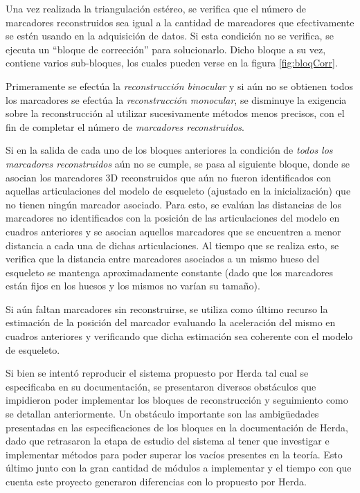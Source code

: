 Una vez realizada la triangulación estéreo, se verifica que el número de marcadores reconstruidos sea igual a la cantidad de marcadores que efectivamente se estén usando en la adquisición de datos. Si esta condición no se verifica, se ejecuta un “bloque de corrección” para solucionarlo. Dicho bloque a su vez, contiene  varios sub-bloques, los cuales pueden verse en la figura \ref{fig:bloqCorr}.

Primeramente se efectúa la \emph{reconstrucción binocular} y si aún no se obtienen todos los marcadores se efectúa la \emph{reconstrucción monocular}, se disminuye la exigencia sobre la reconstrucción al utilizar sucesivamente métodos menos precisos, con el fin de completar el número de \emph{marcadores reconstruidos}.

 Si en la salida de cada uno de los bloques anteriores la condición de \emph{todos los marcadores reconstruidos} aún no se cumple, se pasa al siguiente bloque, donde se asocian los marcadores 3D reconstruidos que aún no fueron identificados con aquellas articulaciones del modelo de esqueleto (ajustado en la inicialización) que no tienen ningún marcador asociado. Para esto, se evalúan las distancias de los marcadores no identificados con la posición de las articulaciones del modelo en cuadros anteriores y se asocian aquellos marcadores que se encuentren a menor distancia a cada una de dichas articulaciones. Al tiempo que se realiza esto, se verifica que la distancia entre marcadores asociados a un mismo hueso del esqueleto se mantenga aproximadamente constante (dado que los marcadores están fijos en los huesos y los mismos no varían su tamaño).
 
Si aún faltan marcadores sin reconstruirse, se utiliza como último recurso la estimación de la posición del marcador evaluando la aceleración del mismo en cuadros anteriores y verificando que dicha estimación sea coherente con el modelo de esqueleto.



Si bien se intentó reproducir el sistema propuesto por Herda\cite{herda} tal cual se especificaba en su documentación, se presentaron diversos obstáculos que impidieron poder implementar los bloques de reconstrucción y seguimiento como se detallan anteriormente. Un obstáculo importante son las ambigüedades presentadas en las especificaciones de los bloques en la documentación de Herda, dado que retrasaron la etapa de estudio del sistema al tener que investigar e implementar métodos para poder superar los vacíos presentes en la teoría. Esto último junto con la gran cantidad de módulos a implementar y el tiempo con que cuenta este proyecto generaron diferencias con lo propuesto por Herda.

